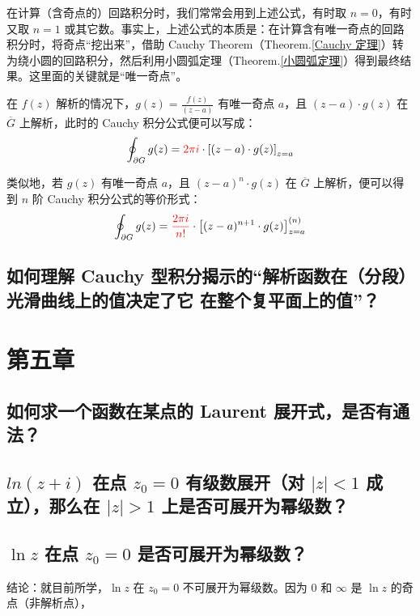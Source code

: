 \documentclass[UTF8]{report}
\theoremstyle{MyLineTheoremStyle} %
\theoremstyle{MyBlockTheoremStyle} %
\theoremstyle{MySubsubsectionStyle} %
\begin{document}
在计算（含奇点的）回路积分时，我们常常会用到上述公式，有时取 $n = 0$，有时又取 $n =1$ 或其它数。事实上，上述公式的本质是：在计算含有唯一奇点的回路积分时，将奇点“挖出来”，借助 Cauchy Theorem（Theorem.\ref{Cauchy 定理}）转为绕小圆的回路积分，然后利用小圆弧定理（Theorem.\ref{小圆弧定理}）得到最终结果。这里面的关键就是“唯一奇点”。

在 $f(z)$ 解析的情况下，$g(z) = \frac{f(z)}{(z - a)}$ 有唯一奇点 $a$，且 $(z - a)\cdot g(z) $ 在 $\overline{G}$ 上解析，此时的 Cauchy 积分公式便可以写成：
\begin{equation}
\oint_{\partial G} g(z) = {\color{red} 2\pi i }\cdot \left[ (z - a)\cdot g(z) \right]_{z = a}
\end{equation}

类似地，若 $g(z)$ 有唯一奇点 $a$，且 $(z - a)^n\cdot g(z) $ 在 $\overline{G}$ 上解析，便可以得到 $n$ 阶 Cauchy 积分公式的等价形式：
\begin{equation}
    \oint_{\partial G} g(z) = {\color{red} \frac{2\pi i}{n!}} \cdot \left[ (z - a)^{n+1}\cdot g(z) \right]^{(n)}_{z = a}
\end{equation}

\subsection{如何理解 Cauchy 型积分揭示的“解析函数在（分段）光滑曲线上的值决定了它 在整个复平面上的值”？}

\section{第五章}

\subsection{如何求一个函数在某点的 Laurent 展开式，是否有通法？}



\subsection{$ln (z + i)$ 在点 $z_0 = 0$ 有级数展开（对 $| z | < 1$ 成立），那么在 $| z | > 1 $ 上是否可展开为幂级数？}

\subsection{$\ln z$ 在点 $z_0 = 0$ 是否可展开为幂级数？}
结论：就目前所学，$\ln z$ 在 $z_0 = 0$ 不可展开为幂级数。因为 $0$ 和 $\infty$ 是 $\ln z$ 的奇点（非解析点），
\end{document}
